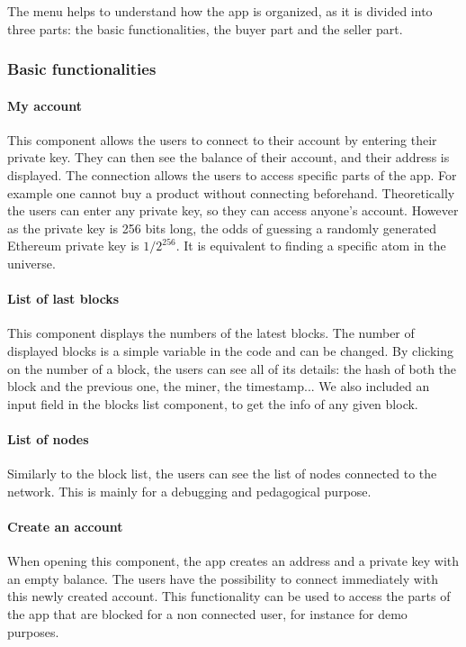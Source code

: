 \documentclass[conference]{IEEEtran}
\begin{document}
The menu helps to understand how the app is organized, as it is divided into three parts: the basic functionalities, the buyer part and the seller part.
\medskip
\subsubsection{Basic functionalities}
\paragraph{My account}
This component allows the users to connect to their account by entering their private key. They can then see the balance of their account, and their address is displayed. The connection allows the users to access specific parts of the app. For example one cannot buy a product without connecting beforehand. Theoretically the users can enter any private key, so they can access anyone's account. However as the private key is 256 bits long, the odds of guessing a randomly generated Ethereum private key is $1/2^{256}$. It is equivalent to finding a specific atom in the universe\cite{BlockchainBandit}.

\paragraph{List of last blocks}
This component displays the numbers of the latest blocks. The number of displayed blocks is a simple variable in the code and can be changed. By clicking on the number of a block, the users can see all of its details: the hash of both the block and the previous one, the miner, the timestamp... We also included an input field in the blocks list component, to get the info of any given block.

\paragraph{List of nodes}
Similarly to the block list, the users can see the list of nodes connected to the network. This is mainly for a debugging and pedagogical purpose.

\paragraph{Create an account}
When opening this component, the app creates an address and a private key with an empty balance. The users have the possibility to connect immediately with this newly created account. This functionality can be used to access the parts of the app that are blocked for a non connected user, for instance for demo purposes.
\medskip
\end{document}
